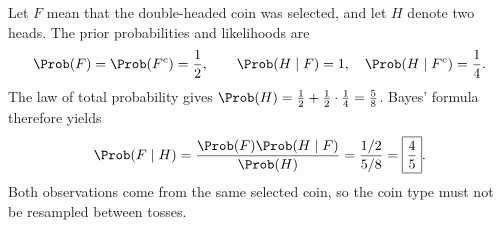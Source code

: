 Let $F$ mean that the double-headed coin was selected, and let $H$ denote two heads. The prior probabilities and likelihoods are
\[
\Prob(F)=\Prob(F^c)=\frac12,\qquad
\Prob(H\mid F)=1,\quad \Prob(H\mid F^c)=\frac14.
\]
The law of total probability gives $\Prob(H)=\frac12+\frac12\cdot\frac14=\frac58$. Bayes' formula therefore yields
\[
\Prob(F\mid H)=\frac{\Prob(F)\Prob(H\mid F)}{\Prob(H)}
=\frac{1/2}{5/8}=\boxed{\frac45}.
\]
Both observations come from the same selected coin, so the coin type must not be resampled between tosses.
